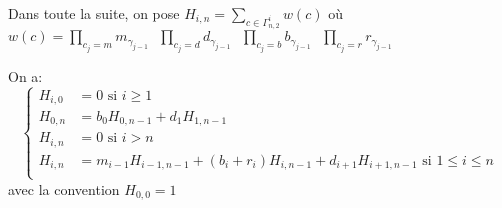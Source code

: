 Dans toute la suite, on pose $H_{i,n} = \underset{c\in \Gamma_{n,2}^{i}}{\sum}w(c)$ où $w(c) = \underset{c_{j}=m}{\prod}
	m_{\gamma_{j-1}}\text{ } \underset{c_{j}=d}{\prod}d_{\gamma_{j-1}}\text{ }\underset{c_{j}=b}{\prod}
	b_{\gamma_{j-1}}\text{ }\underset{c_{j}=r}{\prod}r_{\gamma_{j-1}}$\\
\begin{proposition} \label{weight-tab}
	On a:
	\[
		\begin{cases}
			H_{i,0} & =0 \text{ si }i\geq 1                                                                  \\
			H_{0,n} & =b_{0}H_{0,n-1}+d_{1}H_{1,n-1}                                                         \\
			H_{i,n} & =0 \text{ si } i>n                                                                     \\
			H_{i,n} & =m_{i-1}H_{i-1,n-1}+(b_{i}+r_{i})H_{i,n-1}+d_{i+1}H_{i+1,n-1} \text{ si }1\leq i\leq n \\
		\end{cases}
	\]
	avec la convention $H_{0,0}=1$
\end{proposition}

